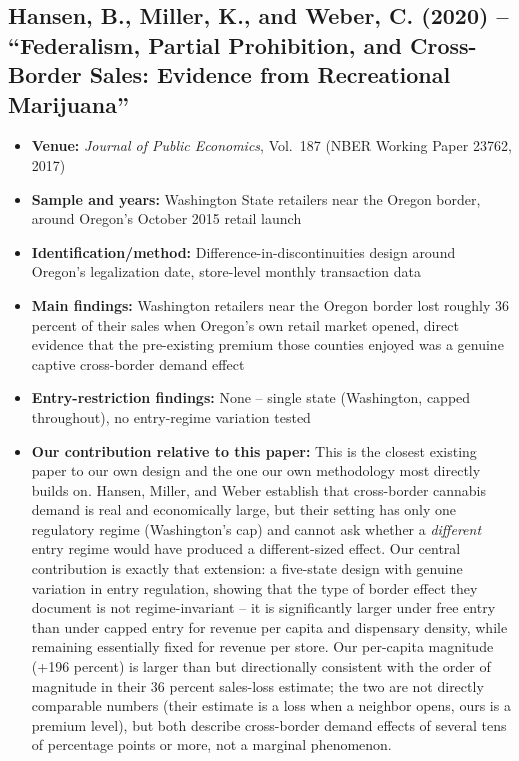\documentclass[11pt]{article}
\begin{document}
\subsection{Hansen, B., Miller, K., and Weber, C. (2020) -- ``Federalism, Partial Prohibition, and
Cross-Border Sales: Evidence from Recreational Marijuana''}
\begin{itemize}
\item \textbf{Venue:} \emph{Journal of Public Economics}, Vol.\ 187 (NBER Working Paper 23762, 2017)
\item \textbf{Sample and years:} Washington State retailers near the Oregon border, around Oregon's October
2015 retail launch
\item \textbf{Identification/method:} Difference-in-discontinuities design around Oregon's legalization date,
store-level monthly transaction data
\item \textbf{Main findings:} Washington retailers near the Oregon border lost roughly 36 percent of their
sales when Oregon's own retail market opened, direct evidence that the pre-existing premium those counties
enjoyed was a genuine captive cross-border demand effect
\item \textbf{Entry-restriction findings:} None -- single state (Washington, capped throughout), no
entry-regime variation tested
\item \textbf{Our contribution relative to this paper:} This is the closest existing paper to our own design
and the one our own methodology most directly builds on. Hansen, Miller, and Weber establish that cross-border
cannabis demand is real and economically large, but their setting has only one regulatory regime (Washington's
cap) and cannot ask whether a \emph{different} entry regime would have produced a different-sized effect. Our
central contribution is exactly that extension: a five-state design with genuine variation in entry
regulation, showing that the type of border effect they document is not regime-invariant -- it is
significantly larger under free entry than under capped entry for revenue per capita and dispensary density,
while remaining essentially fixed for revenue per store. Our per-capita magnitude (+196 percent) is larger
than but directionally consistent with the order of magnitude in their 36 percent sales-loss estimate; the
two are not directly comparable numbers (their estimate is a loss when a neighbor opens, ours is a premium
level), but both describe cross-border demand effects of several tens of percentage points or more, not a
marginal phenomenon.
\end{itemize}
\end{document}
